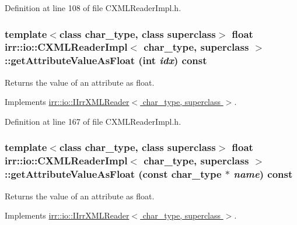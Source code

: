 Definition at line 108 of file CXMLReaderImpl.h.\hypertarget{classirr_1_1io_1_1_c_x_m_l_reader_impl_14d3f55dd2260b970525336713b8270e}{
\subsubsection[{getAttributeValueAsFloat}]{\setlength{\rightskip}{0pt plus 5cm}template$<$class char\_\-type, class superclass$>$ float {\bf irr::io::CXMLReaderImpl}$<$ char\_\-type, {\bf superclass} $>$::getAttributeValueAsFloat (int {\em idx}) const}}
\label{classirr_1_1io_1_1_c_x_m_l_reader_impl_14d3f55dd2260b970525336713b8270e}


Returns the value of an attribute as float. 



Implements \hyperlink{classirr_1_1io_1_1_i_irr_x_m_l_reader_3a01b3cec9db01d00928074846d39add}{irr::io::IIrrXMLReader$<$ char\_\-type, superclass $>$}.

Definition at line 167 of file CXMLReaderImpl.h.\hypertarget{classirr_1_1io_1_1_c_x_m_l_reader_impl_89fb9f69bba65c76e23d6519bcb5df7d}{
\subsubsection[{getAttributeValueAsFloat}]{\setlength{\rightskip}{0pt plus 5cm}template$<$class char\_\-type, class superclass$>$ float {\bf irr::io::CXMLReaderImpl}$<$ char\_\-type, {\bf superclass} $>$::getAttributeValueAsFloat (const char\_\-type $\ast$ {\em name}) const}}
\label{classirr_1_1io_1_1_c_x_m_l_reader_impl_89fb9f69bba65c76e23d6519bcb5df7d}


Returns the value of an attribute as float. 



Implements \hyperlink{classirr_1_1io_1_1_i_irr_x_m_l_reader_2b1032f213e9910827842f6057269235}{irr::io::IIrrXMLReader$<$ char\_\-type, superclass $>$}.

